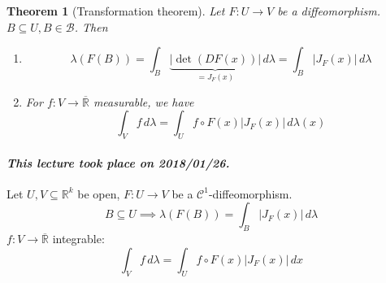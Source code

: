 \documentclass{article}
\newtheorem{theorem}{Theorem}  \numberwithin{theorem}{section}
\newcommand{\card}[1]{\left|#1\right|}
\newcommand{\dateref}[1]{\paragraph{\textit{This lecture took place on #1.}}}
\begin{document}
\begin{theorem}[Transformation theorem]
  Let $F: U \to V$ be a diffeomorphism. $B \subseteq U, B \in \mathcal B$. Then
  \begin{enumerate}
    \item \[ \lambda(F(B)) = \int_B \underbrace{\card{\det(DF(x))}}_{= J_F(x)} \, d\lambda = \int_B \card{J_F(x)} \, d\lambda \]
    \item For $f: V \to \overline{\mathbb R}$ measurable, we have
      \[ \int_V f \, d\lambda = \int_U f \circ F(x) \card{J_F(x)} \, d\lambda(x) \]
  \end{enumerate}
\end{theorem}

\dateref{2018/01/26}

Let $U, V \subseteq \mathbb R^k$ be open, $F: U \to V$ be a $\mathcal C^1$-diffeomorphism.
\[ B \subseteq U \implies \lambda(F(B)) = \int_B \card{J_F(x)} \, d\lambda \]
$f: V \to \overline{\mathbb R}$ integrable:
\[ \int_V f \, d\lambda = \int_U f \circ F(x) \card{J_F(x)} \, dx \]
\end{document}
